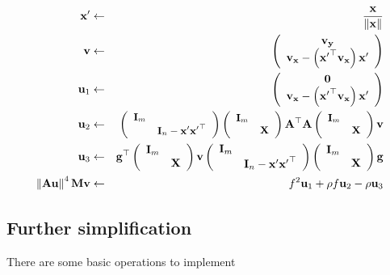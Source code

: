 \documentclass{article}
\newcommand{\x}{\mathbf{x}}
\newcommand{\A}{\mathbf{A}}
\newcommand{\0}{\textbf{0}}
\newcommand{\X}{\mathbf{X}}
\newcommand{\I}{\mathbf{I}}
\newcommand{\g}{\mathbf{g}}
\newcommand{\M}{\mathbf{M}}
\newcommand{\y}{\mathbf{y}}
\newcommand{\tmu}{\mathbf{u}}
\newcommand{\tmv}{\mathbf{v}}
\begin{document}
\begin{eqnarray*}
  \x' & \leftarrow & \frac{\x}{\left\| \x \right\|}\\
  \tmv & \leftarrow & \left(\begin{array}{c}
    \tmv_{\y}\\
    \tmv_{\x} - \left( {\x'}^{\top} \tmv_{\x} \right) \x'
  \end{array}\right)\\
  \tmu_1 & \leftarrow & \left(\begin{array}{c}
    \0\\
    \tmv_{\x} - \left( {\x'}^{\top} \tmv_{\x} \right) \x'
  \end{array}\right)\\
  \tmu_2 & \leftarrow & \small{\left(\begin{array}{cc}
    \I_m & \\
    & \I_n - \x' {\x'}^{\top}
  \end{array}\right)} \left(\begin{array}{cc}
    \I_m & \\
    & \X
  \end{array}\right) \A^{\top} \A \left(\begin{array}{cc}
    \I_m & \\
    & \X
  \end{array}\right) \tmv\\
  \tmu_3 & \leftarrow & \g^{\top} \left(\begin{array}{cc}
    \I_m & \\
    & \X
  \end{array}\right) \tmv \left(\begin{array}{cc}
    \I_m & \\
    & \I_n - \x' {\x'}^{\top}
  \end{array}\right) \left(\begin{array}{cc}
    \I_m & \\
    & \X
  \end{array}\right) \g\\
  \left\| \A \tmu \right\|^4 \M \tmv & \leftarrow & f^2 \tmu_1 + \rho f \tmu_2
  - \rho \tmu_3
\end{eqnarray*}

\subsection{Further simplification}

There are some basic operations to implement
\end{document}
